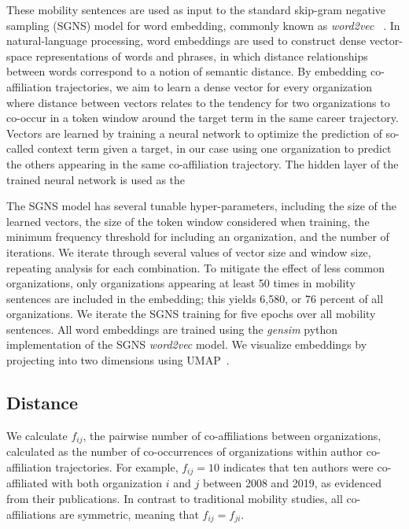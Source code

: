 \documentclass[12pt]{article} %
\begin{document}
These mobility sentences are used as input to the standard skip-gram negative sampling (SGNS) model for word embedding, commonly known as \textit{word2vec}~\autocite{mikolov2013word2vec} . 
In natural-language processing, word embeddings are used to construct dense vector-space representations of words and phrases, in which distance relationships between words correspond to a notion of semantic distance. 
By embedding co-affiliation trajectories, we aim to learn a dense vector for every organization where distance between vectors relates to the tendency for two organizations to co-occur in a token window around the target term in the same career trajectory. 
Vectors are learned by training a neural network to optimize the prediction of so-called context term given a target, in our case using one organization to predict the others appearing in the same co-affiliation trajectory. 
The hidden layer of the trained neural network is used as the 

The SGNS model has several tunable hyper-parameters, including the size of the learned vectors, the size of the token window  considered when training, the minimum frequency threshold for including an organization, and the number of iterations.
We iterate through several values of vector size and window size, repeating analysis for each combination. 
To mitigate the effect of less common organizations, only organizations appearing at least 50 times in mobility sentences are included in the embedding;
this yields 6,580, or 76 percent of all organizations.
We iterate the SGNS training for five epochs over all mobility sentences. 
All word embeddings are trained using the \textit{gensim} python implementation of the SGNS \textit{word2vec} model. 
We visualize embeddings by projecting into two dimensions using UMAP~\autocite{mcinnes2018umap}.

%
%
\subsection{Distance}
We calculate $f_{ij}$, the pairwise number of co-affiliations between organizations, calculated as the number of co-occurrences of organizations within author co-affiliation trajectories. 
For example, $f_{ij} = 10$ indicates that ten authors were co-affiliated with both organization $i$ and $j$ between 2008 and 2019, as evidenced from their publications. 
In contrast to traditional mobility studies, all co-affiliations are symmetric, meaning that $f_{ij} = f_{ji}$. 
\end{document}
